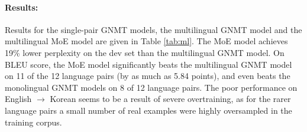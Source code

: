 \documentclass{article}
\begin{document}
\paragraph{Results:} Results for the single-pair GNMT models, the multilingual GNMT model and the multilingual MoE model are given in Table \ref{tab:ml}.   The MoE model achieves 19\% lower perplexity on the dev set than the multilingual GNMT model.   On BLEU score, the MoE model significantly beats the multilingual GNMT model on 11 of the 12 language pairs (by as much as 5.84 points), and even beats the monolingual GNMT models on 8 of 12 language pairs.  The poor performance on English $\rightarrow$ Korean seems to be a result of severe overtraining, as for the rarer language pairs a small number of real examples were highly oversampled in the training corpus. 
\end{document}
